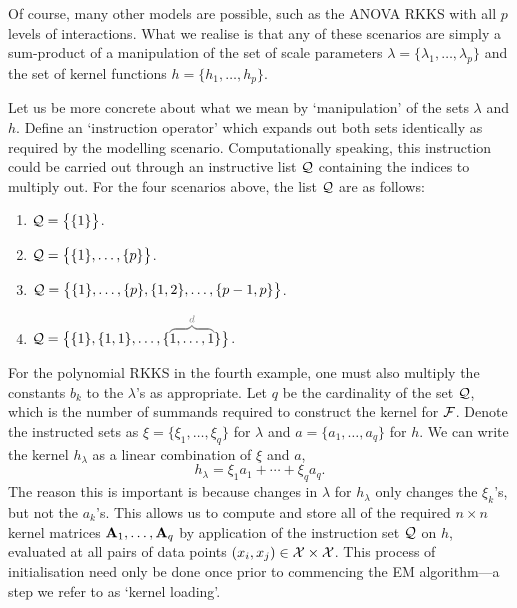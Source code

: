 Of course, many other models are possible, such as the ANOVA RKKS with all $p$ levels of interactions.
What we realise is that any of these scenarios are simply a sum-product of a manipulation of the set of scale parameters $\lambda = \{\lambda_1,\dots,\lambda_p\}$ and the set of kernel functions $h = \{h_1,\dots,h_p\}$.

Let us be more concrete about what we mean by `manipulation' of the sets $\lambda$ and $h$.
Define an `instruction operator' which expands out both sets identically as required by the modelling scenario.
Computationally speaking, this instruction could be carried out through an instructive list ${\mathcal Q}$ containing the indices to multiply out.
For the four scenarios above, the list ${\mathcal Q}$ are as follows:
\begin{enumerate}
  \item ${\mathcal Q} = \big\{ \{1\} \big\}$.
  \item ${\mathcal Q} = \big\{ \{1\},\dots,\{p\}\big\}$.
  \item ${\mathcal Q} = \big\{ \{1\},\dots,\{p\},\{1,2\},\dots, \{p-1,p\}\big\}$.
  \item $\cQ = \big\{ \{1\},\{1,1\},\dots, \{\myoverbrace{1,\dots,1}{d}\}\big\}$.
\end{enumerate}
For the polynomial RKKS in the fourth example, one must also multiply the constants $b_k$ to the $\lambda$'s as appropriate.
Let $q$ be the cardinality of the set ${\mathcal Q}$, which is the number of summands required to construct the kernel for ${\mathcal F}$.
Denote the instructed sets as $\xi = \{\xi_1,\dots,\xi_q \}$ for $\lambda$ and $a = \{a_1,\dots,a_q\}$ for $h$.
We can write the kernel $h_\lambda$ as a linear combination of $\xi$ and $a$,
\[
  h_\lambda = \xi_1a_1 + \cdots + \xi_qa_q.
\]
The reason this is important is because changes in $\lambda$ for $h_\lambda$ only changes the $\xi_k$'s, but not the $a_k$'s.
This allows us to compute and store all of the required $n\times n$ kernel matrices ${\mathbf A}_1,\dots,{\mathbf A}_q$ by application of the instruction set ${\mathcal Q}$ on $h$, evaluated at all pairs of data points $(x_i,x_j)\in{\mathcal X}\times{\mathcal X}$.
This process of initialisation need only be done once prior to commencing the EM algorithm---a step we refer to as `kernel loading'.

